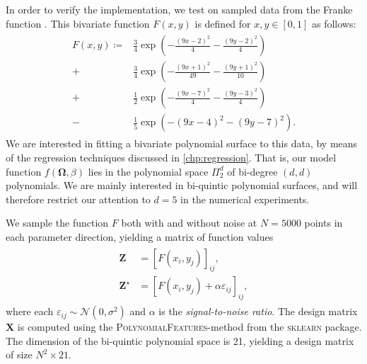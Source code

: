 \documentclass[dvipsnames, article, a4paper, oneside, 12pt]{memoir}
\newcommand{\mat}[1]{\bm{#1}}
\newcommand{\data}{\bm{\Omega}}
\newcommand{\N}{\mathcal{N}}
\begin{document}
  In order to verify the implementation, we test on sampled data from the
  Franke function \cite{frankeCriticalComparisonMethods1979}. This bivariate
  function \(F(x, y) \) is defined for \( x, y \in [0, 1] \) as follows:
  \begin{align}
    \begin{split}
      F(x,y) \coloneqq &\frac{3}{4} \exp\left( -\frac{(9x - 2)^2}{4} - \frac{(9y - 2)^2}{4}\right) \\
      + &\frac{3}{4}\exp\left( -\frac{(9x + 1)^2}{49} - \frac{(9 y + 1)^2}{10}\right) \\
      + &\frac{1}{2}\exp\left(-\frac{(9x-7)^2}{4} - \frac{(9y-3)^2}{4}\right) \\
      - &\frac{1}{5}\exp\left(-(9x - 4)^2 - (9y - 7)^2\right).
    \end{split} 
  \end{align}
  We are interested in fitting a bivariate polynomial surface to this data, by
  means of the regression techniques discussed in \cref{chp:regression}. That
  is, our model function \( f(\data, \beta) \) lies in the polynomial space \(
  \Pi_{2}^d \) of bi-degree \( (d, d) \) polynomials. We are mainly interested
  in bi-quintic polynomial surfaces, and will therefore restrict our attention
  to \( d = 5 \) in the numerical experiments.
  
  We sample the function \( F \) both with and without noise at \( N = 5000 \) points in each
  parameter direction, yielding a matrix of function values
  \begin{align}
    \begin{split}
      \mat{Z} &= \left[F(x_i, y_j) \right]_{ij}, \\
      \mat{Z}^\star &= \left[F(x_i, y_j) + \alpha\varepsilon_{ij}\right]_{ij},
    \end{split}
  \end{align}
  where each \( \varepsilon_{ij} \sim \N(0, \sigma^2) \) and \( \alpha \) is
  the \emph{signal-to-noise ratio}. The design matrix \( \mat{X} \) is computed
  using the \textsc{PolynomialFeatures}-method from the \textsc{sklearn}
  package. The dimension of the bi-quintic polynomial space is 21, yielding a
  design matrix of size \( N^2 \times 21 \).
\end{document}
